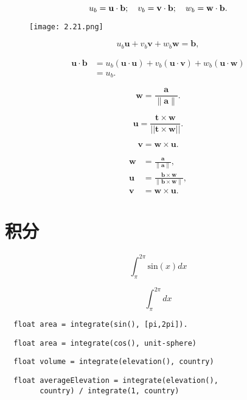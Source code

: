 \documentclass[lang=cn,12pt,marginpar=margintrue]{elegantbook}
\begin{document}
\[
  u_{b}={\bf u}\cdot{\bf b};\quad v_{b}={\bf v}\cdot{\bf b};\quad w_{b}={\bf w}\cdot{\bf b}.
\]

\begin{figure}[htb]
  \centering
  \texttt{[image: 2.21.png]}
  \caption{}
\end{figure}

\[
  u_{b}\mathbf{u}+v_{b}\mathbf{v}+w_{b}\mathbf{w}=\mathbf{b},
\]

\[
  \begin{aligned}
    \mathbf{u \cdot b} & =u_{b}(\mathbf{u \cdot u})+v_{b}(\mathbf{u \cdot v})+w_{b}(\mathbf{u \cdot w}) \\
                       & =u_{b}.
  \end{aligned}
\]

\[
  \mathbf{w}={\frac{\mathbf{a}}{\|\mathbf{a}\|}}.
\]

\[
  \mathbf{u}={\frac{\mathbf{t}\times\mathbf{w}}{\left||\mathbf{t}\times\mathbf{w}|\right|}}.
\]

\[
  \mathbf{v}=\mathbf{w}\times\mathbf{u}.
\]

\[
  \begin{aligned}
    \mathbf{w} & ={\frac{\mathbf{a}}{\|\mathbf{a}\|}},                                 \\
    \mathbf{u} & ={\frac{\mathbf{b}\times\mathbf{w}}{\|\mathbf{b}\times\mathbf{w}\|}}, \\
    \mathbf{v} & =\mathbf{w}\times\mathbf{u}.
  \end{aligned}
\]

\section{积分}

\[
  \int_{\pi}^{2\pi}\mathrm{sin}(x) dx
\]

\[
  \int_{\pi}^{2\pi} dx
\]

\begin{lstlisting}
  float area = integrate(sin(), [pi,2pi]).
\end{lstlisting}

\begin{lstlisting}
  float area = integrate(cos(), unit-sphere)
\end{lstlisting}

\begin{lstlisting}
  float volume = integrate(elevation(), country)
\end{lstlisting}

\begin{lstlisting}
  float averageElevation = integrate(elevation(),
        country) / integrate(1, country)
\end{lstlisting}
\end{document}
